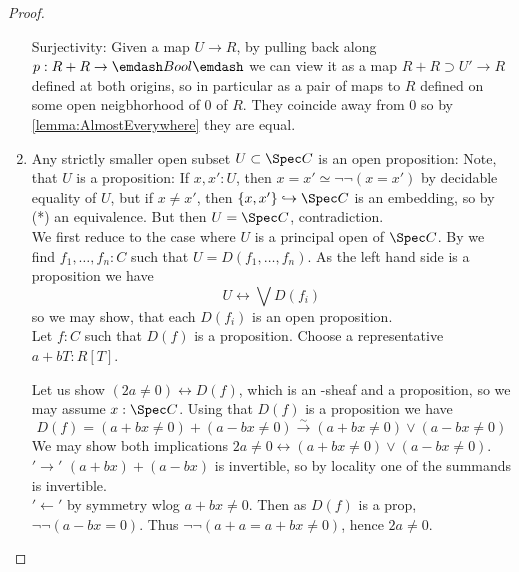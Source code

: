 \begin{proof}
\begin{enumerate}
		Surjectivity: Given a map $U \to R$, by pulling back along $p : R + R \to \emdash Bool \emdash$  we can view it as a map $R + R \supset U' \to R$ defined at both origins, so in particular as a pair of maps to $R$ defined on some open neigbhorhood of 0 of $R$. They coincide away from 0 so by \ref{lemma:AlmostEverywhere} they are equal.
		\item 
		Any strictly smaller open subset $U \subset \Spec C$ is an open proposition:
		Note, that $U$ is a proposition: If $x,x' : U$, then $x = x' \simeq \lnot \lnot (x = x')$ by decidable equality of $U$, but if $x \neq x'$, then $\{x,x'\} \hookrightarrow \Spec C$ is an embedding, so by (*) an equivalence. But then $U = \Spec C$, contradiction. \\
		We first reduce to the case where $U$ is a principal open of $\Spec C$. By \cite{cherubini2023foundationsyntheticalgebraicgeometry} we find $f_1,\hdots,f_n : C$ such that $U = D(f_1,\hdots,f_n)$. As the left hand side is a proposition we have
		\[
		U \leftrightarrow \bigvee D(f_i)
		\]
		so we may show, that each $D(f_i)$ is an open proposition. \\
		Let $f : C$ such that $D(f)$ is a proposition. Choose a representative $a + bT : R[T]$.
		
		Let us show $(2a \neq 0) \leftrightarrow D(f)$, which is an \etale-sheaf and a proposition, so we may assume $x : \Spec C$.
		Using that $D(f)$ is a proposition we have
		\[
		D(f) =  (a+bx \neq 0) + (a-bx \neq 0) \overset{\sim}{\to} (a+bx \neq 0) \lor (a-bx \neq 0)
		\]
		We may show both implications $2a \neq 0 \leftrightarrow (a+bx \neq 0) \lor (a-bx \neq 0) $. \\
		$'\rightarrow'$ $(a+bx) + (a-bx)$ is invertible, so by locality one of the summands is invertible. \\
		$'\leftarrow'$ by symmetry wlog $a + bx \neq 0$. Then as $D(f)$ is a prop, $\lnot \lnot (a - bx = 0)$. Thus $\lnot \lnot (a + a = a + bx \neq 0)$, hence $2 a \neq 0$. 
		
	\end{enumerate}
\end{proof}
